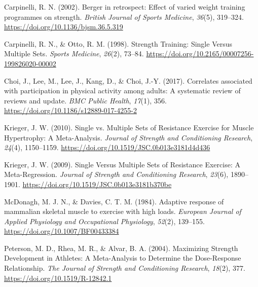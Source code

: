 \documentclass[
  letterpaper,
  DIV=11,
  numbers=noendperiod]{scrartcl}
\newlength{\cslhangindent}
\newlength{\cslentryspacingunit} %
\newenvironment{CSLReferences}[2] %
 {%
  \setlength{\parindent}{0pt}
  \ifodd #1
  \let\oldpar\par
  \def\par{\hangindent=\cslhangindent\oldpar}
  \fi
  \setlength{\parskip}{#2\cslentryspacingunit}
 }%
 {}
\begin{document}
\hypertarget{refs}{}
\begin{CSLReferences}{1}{0}
\leavevmode{}%
Carpinelli, R. N. (2002). Berger in retrospect: Effect of varied weight
training programmes on strength. \emph{British Journal of Sports
Medicine}, \emph{36}(5), 319--324.
\url{https://doi.org/10.1136/bjsm.36.5.319}

\leavevmode{}%
Carpinelli, R. N., \& Otto, R. M. (1998). Strength {Training}: {Single}
{Versus} {Multiple} {Sets}. \emph{Sports Medicine}, \emph{26}(2),
73--84. \url{https://doi.org/10.2165/00007256-199826020-00002}

\leavevmode{}%
Choi, J., Lee, M., Lee, J., Kang, D., \& Choi, J.-Y. (2017). Correlates
associated with participation in physical activity among adults: A
systematic review of reviews and update. \emph{BMC Public Health},
\emph{17}(1), 356. \url{https://doi.org/10.1186/s12889-017-4255-2}

\leavevmode{}%
Krieger, J. W. (2010). Single vs. {Multiple} {Sets} of {Resistance}
{Exercise} for {Muscle} {Hypertrophy}: {A} {Meta}-{Analysis}.
\emph{Journal of Strength and Conditioning Research}, \emph{24}(4),
1150--1159. \url{https://doi.org/10.1519/JSC.0b013e3181d4d436}

\leavevmode{}%
Krieger, J. W. (2009). Single {Versus} {Multiple} {Sets} of {Resistance}
{Exercise}: {A} {Meta}-{Regression}. \emph{Journal of Strength and
Conditioning Research}, \emph{23}(6), 1890--1901.
\url{https://doi.org/10.1519/JSC.0b013e3181b370be}

\leavevmode{}%
McDonagh, M. J. N., \& Davies, C. T. M. (1984). Adaptive response of
mammalian skeletal muscle to exercise with high loads. \emph{European
Journal of Applied Physiology and Occupational Physiology},
\emph{52}(2), 139--155. \url{https://doi.org/10.1007/BF00433384}

\leavevmode{}%
Peterson, M. D., Rhea, M. R., \& Alvar, B. A. (2004). Maximizing
{Strength} {Development} in {Athletes}: {A} {Meta}-{Analysis} to
{Determine} the {Dose}-{Response} {Relationship}. \emph{The Journal of
Strength and Conditioning Research}, \emph{18}(2), 377.
\url{https://doi.org/10.1519/R-12842.1}


\end{CSLReferences}
\end{document}
